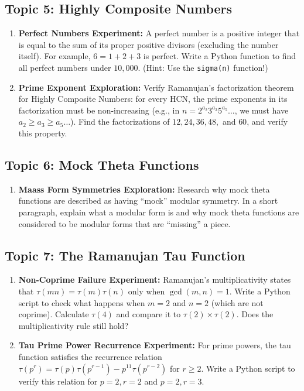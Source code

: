 \documentclass[11pt]{article}
\begin{document}
\subsection{Topic 5: Highly Composite Numbers}
\begin{enumerate}
    \item \textbf{Perfect Numbers Experiment:} A perfect number is a positive integer that is equal to the sum of its proper positive divisors (excluding the number itself). For example, $6 = 1 + 2 + 3$ is perfect. Write a Python function to find all perfect numbers under $10,000$. (Hint: Use the \texttt{sigma(n)} function!)
    \item \textbf{Prime Exponent Exploration:} Verify Ramanujan's factorization theorem for Highly Composite Numbers: for every HCN, the prime exponents in its factorization must be non-increasing (e.g., in $n = 2^{a_2} 3^{a_3} 5^{a_5} \dots$, we must have $a_2 \ge a_3 \ge a_5 \dots$). Find the factorizations of $12, 24, 36, 48,$ and $60$, and verify this property.
\end{enumerate}

\subsection{Topic 6: Mock Theta Functions}
\begin{enumerate}
    \item \textbf{Maass Form Symmetries Exploration:} Research why mock theta functions are described as having ``mock'' modular symmetry. In a short paragraph, explain what a modular form is and why mock theta functions are considered to be modular forms that are ``missing'' a piece.
\end{enumerate}

\subsection{Topic 7: The Ramanujan Tau Function}
\begin{enumerate}
    \item \textbf{Non-Coprime Failure Experiment:} Ramanujan's multiplicativity states that $\tau(mn) = \tau(m)\tau(n)$ only when $\gcd(m,n)=1$. Write a Python script to check what happens when $m=2$ and $n=2$ (which are not coprime). Calculate $\tau(4)$ and compare it to $\tau(2) \times \tau(2)$. Does the multiplicativity rule still hold?
    \item \textbf{Tau Prime Power Recurrence Experiment:} For prime powers, the tau function satisfies the recurrence relation $\tau(p^r) = \tau(p)\tau(p^{r-1}) - p^{11}\tau(p^{r-2})$ for $r \ge 2$. Write a Python script to verify this relation for $p=2, r=2$ and $p=2, r=3$.
\end{enumerate}
\end{document}
